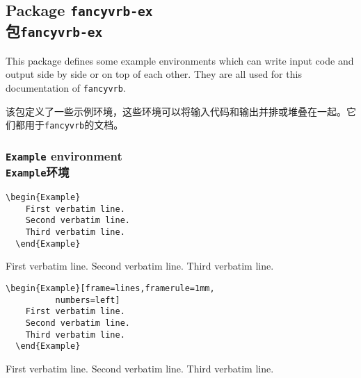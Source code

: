 \documentclass[twoside]{article}
\begin{document}
\begin{changebar}
\part{Package \texttt{fancyvrb-ex}\\包\texttt{fancyvrb-ex}}
This package defines some example environments which can write input code
and output side by side or on top of each other. They are all used for this documentation of \texttt{fancyvrb}.

该包定义了一些示例环境，这些环境可以将输入代码和输出并排或堆叠在一起。它们都用于\texttt{fancyvrb}的文档。



\section{\texttt{Example} environment\\\texttt{Example}环境}


\begin{Verbatim}[gobble=2]
  \begin{Example}
    First verbatim line.
    Second verbatim line.
    Third verbatim line.
  \end{Example}
\end{Verbatim}

\begin{Example}
  First verbatim line.
  Second verbatim line.
  Third verbatim line.
\end{Example}

\begin{Verbatim}[gobble=2]
  \begin{Example}[frame=lines,framerule=1mm,
          numbers=left]
    First verbatim line.
    Second verbatim line.
    Third verbatim line.
  \end{Example}
\end{Verbatim}

\begin{Example}[frame=lines,framerule=1mm,numbers=left]
  First verbatim line.
  Second verbatim line.
  Third verbatim line.
\end{Example}


\end{changebar}
\end{document}

